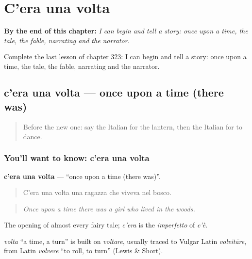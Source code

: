 
\chapter{C'era una volta}
\label{ch:it-c-era-una-volta}

\begin{chapteropening}
\textbf{By the end of this chapter:} \emph{I can begin and tell a story: once upon a time, the tale, the fable, narrating and the narrator.}

Complete the last lesson of chapter 323: I can begin and tell a story: once upon a time, the tale, the fable, narrating and the narrator.
\end{chapteropening}

\section[c'era una volta]{c'era una volta — once upon a time (there was)}

\label{lesson:IT-C323-c-era-una-volta}



\begin{quote}
Before the new one: say the Italian for the lantern, then the Italian for to dance.
\end{quote}

\subsection*{You'll want to know: c'era una volta}
\textbf{c'era una volta} — \textquotedblleft{}once upon a time (there was)\textquotedblright{}.

\begin{quote}
C'era una volta una ragazza che viveva nel bosco.
\end{quote}

\begin{quote}
\emph{Once upon a time there was a girl who lived in the woods.}
\end{quote}

The opening of almost every fairy tale; \emph{c'era} is the \emph{imperfetto} of \emph{c'è}.

\begin{cousinweb}
\emph{volta} \textquotedblleft{}a time, a turn\textquotedblright{} is built on \emph{voltare}, usually traced to Vulgar Latin \emph{volvitāre}, from Latin \emph{volvere} \textquotedblleft{}to roll, to turn\textquotedblright{} (Lewis \& Short).
\end{cousinweb}

